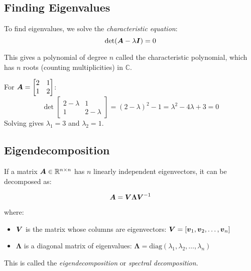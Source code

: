 \subsection{Finding Eigenvalues}

To find eigenvalues, we solve the \emph{characteristic equation}:
\begin{equation}
    \det(\boldsymbol{A} - \lambda\boldsymbol{I}) = 0
\end{equation}

This gives a polynomial of degree $n$ called the characteristic polynomial, which has $n$ roots (counting multiplicities) in $\mathbb{C}$.

\begin{example}
For $\boldsymbol{A} = \begin{bmatrix} 2 & 1 \\ 1 & 2 \end{bmatrix}$:
\begin{equation}
    \det\begin{bmatrix} 2-\lambda & 1 \\ 1 & 2-\lambda \end{bmatrix} = (2-\lambda)^2 - 1 = \lambda^2 - 4\lambda + 3 = 0
\end{equation}
Solving gives $\lambda_1 = 3$ and $\lambda_2 = 1$.
\end{example}

\subsection{Eigendecomposition}

If a matrix $\boldsymbol{A} \in \mathbb{R}^{n \times n}$ has $n$ linearly independent eigenvectors, it can be decomposed as:

\begin{equation}
    \boldsymbol{A} = \boldsymbol{V}\boldsymbol{\Lambda}\boldsymbol{V}^{-1}
\end{equation}

where:
\begin{itemize}
    \item $\boldsymbol{V}$ is the matrix whose columns are eigenvectors: $\boldsymbol{V} = [\boldsymbol{v}_1, \boldsymbol{v}_2, \ldots, \boldsymbol{v}_n]$
    \item $\boldsymbol{\Lambda}$ is a diagonal matrix of eigenvalues: $\boldsymbol{\Lambda} = \text{diag}(\lambda_1, \lambda_2, \ldots, \lambda_n)$
\end{itemize}

This is called the \emph{eigendecomposition} or \emph{spectral decomposition}.

